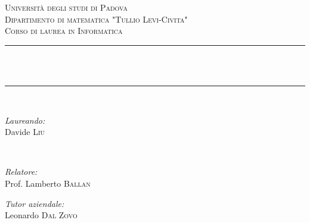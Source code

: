 \begin{titlepage}

\newcommand{\HRule}{\rule{\linewidth}{0.5mm}} %

\center %
 

\textsc{\LARGE Università degli studi di Padova}\\[0.5cm] %
\textsc{\Large Dipartimento di matematica "Tullio Levi-Civita"}\\[0.5cm] %
\textsc{\large Corso di laurea in Informatica}\\[0.5cm] %


\HRule \\[0.4cm]
{ \huge \bfseries \titolo}\\[0.4cm] %
\HRule \\[1.5cm]
 

\begin{minipage}{0.4\textwidth}
\begin{flushleft} \large
\emph{Laureando:}\\
Davide \textsc{Liu} %
\end{flushleft}
\end{minipage}
~
\begin{minipage}{0.4\textwidth}
\begin{flushright} \large
\emph{Relatore:} \\
Prof. Lamberto \textsc{Ballan} %
\end{flushright}
\begin{flushright} \large
\emph{Tutor aziendale:} \\
Leonardo \textsc{Dal Zovo} %
\end{flushright}
\end{minipage}\\[1cm]


\end{titlepage}

